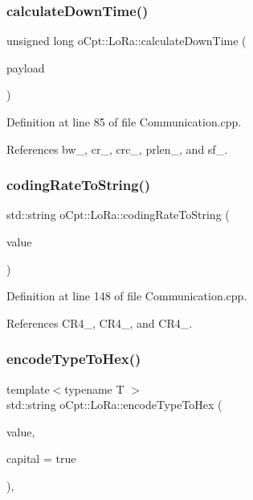 \subsubsection{\texorpdfstring{calculate\+Down\+Time()}{calculateDownTime()}}
{\footnotesize\ttfamily unsigned long o\+Cpt\+::\+Lo\+Ra\+::calculate\+Down\+Time (\begin{DoxyParamCaption}\item[{unsigned int}]{payload }\end{DoxyParamCaption})\hspace{0.3cm}{\ttfamily [protected]}}



Definition at line 85 of file Communication.\+cpp.



References bw\+\_\+, cr\+\_\+, crc\+\_\+, prlen\+\_\+, and sf\+\_\+.

\hypertarget{classo_cpt_1_1_lo_ra_a404a9de4e173c0f17c7ca6a915a7fa4b}{}\label{classo_cpt_1_1_lo_ra_a404a9de4e173c0f17c7ca6a915a7fa4b} 
\subsubsection{\texorpdfstring{coding\+Rate\+To\+String()}{codingRateToString()}}
{\footnotesize\ttfamily std\+::string o\+Cpt\+::\+Lo\+Ra\+::coding\+Rate\+To\+String (\begin{DoxyParamCaption}\item[{const \hyperlink{classo_cpt_1_1_lo_ra_a9bbdbc3b6fefdabd52bbb3ebbebcee7a}{Coding\+Rate} \&}]{value }\end{DoxyParamCaption})\hspace{0.3cm}{\ttfamily [protected]}}



Definition at line 148 of file Communication.\+cpp.



References C\+R4\+\_, C\+R4\+\_, and C\+R4\+\_.

\hypertarget{classo_cpt_1_1_lo_ra_a49199ac50e2771b874331e2dffaa8b2c}{}\label{classo_cpt_1_1_lo_ra_a49199ac50e2771b874331e2dffaa8b2c} 
\subsubsection{\texorpdfstring{encode\+Type\+To\+Hex()}{encodeTypeToHex()}}
{\footnotesize\ttfamily template$<$typename T $>$ \\
std\+::string o\+Cpt\+::\+Lo\+Ra\+::encode\+Type\+To\+Hex (\begin{DoxyParamCaption}\item[{T}]{value,  }\item[{bool}]{capital = {\ttfamily true} }\end{DoxyParamCaption})\hspace{0.3cm}{\ttfamily [inline]}, {\ttfamily [protected]}}

